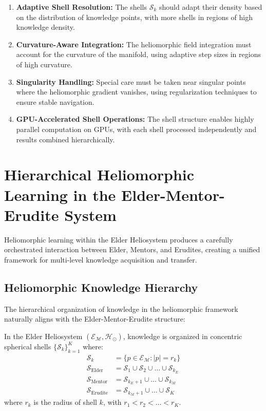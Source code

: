 \begin{enumerate}
    \item \textbf{Adaptive Shell Resolution:} The shells $\mathcal{S}_k$ should adapt their density based on the distribution of knowledge points, with more shells in regions of high knowledge density.
    
    \item \textbf{Curvature-Aware Integration:} The heliomorphic field integration must account for the curvature of the manifold, using adaptive step sizes in regions of high curvature.
    
    \item \textbf{Singularity Handling:} Special care must be taken near singular points where the heliomorphic gradient vanishes, using regularization techniques to ensure stable navigation.
    
    \item \textbf{GPU-Accelerated Shell Operations:} The shell structure enables highly parallel computation on GPUs, with each shell processed independently and results combined hierarchically.
\end{enumerate}

\section{Hierarchical Heliomorphic Learning in the Elder-Mentor-Erudite System}\label{sec:hierarchical_heliomorphic_learning}

Heliomorphic learning within the Elder Heliosystem produces a carefully orchestrated interaction between Elder, Mentors, and Erudites, creating a unified framework for multi-level knowledge acquisition and transfer.

\subsection{Heliomorphic Knowledge Hierarchy}

The hierarchical organization of knowledge in the heliomorphic framework naturally aligns with the Elder-Mentor-Erudite structure:

\begin{theorem}
In the Elder Heliosystem $(\mathcal{E}_{\mathcal{M}}, \mathcal{H}_{\odot})$, knowledge is organized in concentric spherical shells $\{\mathcal{S}_k\}_{k=1}^K$ where:
\begin{align}
\mathcal{S}_k &= \{p \in \mathcal{E}_{\mathcal{M}} : |p| = r_k\}\\
\mathcal{S}_{\text{Elder}} &= \mathcal{S}_1 \cup \mathcal{S}_2 \cup \ldots \cup \mathcal{S}_{k_E}\\
\mathcal{S}_{\text{Mentor}} &= \mathcal{S}_{k_E+1} \cup \ldots \cup \mathcal{S}_{k_M}\\
\mathcal{S}_{\text{Erudite}} &= \mathcal{S}_{k_M+1} \cup \ldots \cup \mathcal{S}_K
\end{align}
where $r_k$ is the radius of shell $k$, with $r_1 < r_2 < \ldots < r_K$.
\end{theorem}

